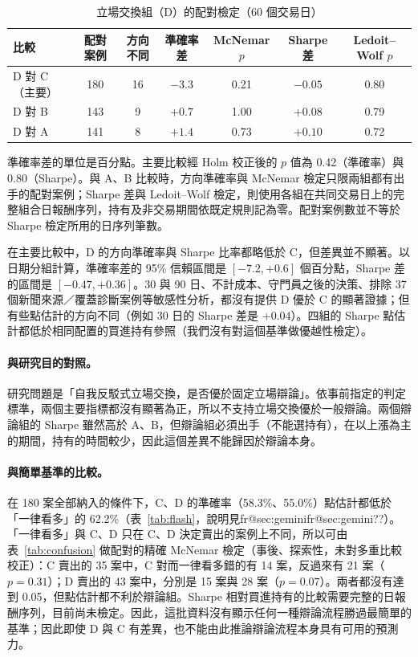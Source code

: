 \documentclass[12pt,a4paper]{article}
\makeatletter
\numberwithin{table}{section}
\numberwithin{figure}{section}
\newcommand{\frref}[1]{\ifcsname fr@#1\endcsname\csname fr@#1\endcsname\else ??\fi}
\newcommand{\grp}[1]{\textsf{#1}}
\makeatother
\begin{document}
\begin{table}[H]
\centering\small
\caption{立場交換組（\grp{D}）的配對檢定（60 個交易日）}
\label{tab:tests}
\setlength{\tabcolsep}{4pt}
\begin{tabular}{@{}lcccccc@{}}
\toprule
比較 & 配對案例 & 方向不同 & 準確率差 & McNemar $p$ & Sharpe 差 & Ledoit--Wolf $p$ \\
\midrule
\grp{D} 對 \grp{C}（主要） & 180 & 16 & $-3.3$ & 0.21 & $-0.05$ & 0.80 \\
\grp{D} 對 \grp{B} & 143 & 9 & $+0.7$ & 1.00 & $+0.08$ & 0.79 \\
\grp{D} 對 \grp{A} & 141 & 8 & $+1.4$ & 0.73 & $+0.10$ & 0.72 \\
\bottomrule
\end{tabular}
\par\smallskip
\raggedright\footnotesize 準確率差的單位是百分點。主要比較經 Holm 校正後的 $p$ 值為 0.42（準確率）與 0.80（Sharpe）。與 \grp{A}、\grp{B} 比較時，方向準確率與 McNemar 檢定只限兩組都有出手的配對案例；Sharpe 差與 Ledoit--Wolf 檢定，則使用各組在共同交易日上的完整組合日報酬序列，持有及非交易期間依既定規則記為零。配對案例數並不等於 Sharpe 檢定所用的日序列筆數。
\end{table}

在主要比較中，\grp{D} 的方向準確率與 Sharpe 比率都略低於 \grp{C}，但差異並不顯著。以日期分組計算，準確率差的 95\% 信賴區間是 $[-7.2, +0.6]$ 個百分點，Sharpe 差的區間是 $[-0.47,+0.36]$。30 與 90 日、不計成本、守門員之後的決策、排除 37 個新聞來源／覆蓋診斷案例等敏感性分析，都沒有提供 \grp{D} 優於 \grp{C} 的顯著證據；但有些點估計的方向不同（例如 30 日的 Sharpe 差是 $+0.04$）。四組的 Sharpe 點估計都低於相同配置的買進持有參照（我們沒有對這個基準做優越性檢定）。

\paragraph{與研究目的對照。} 研究問題是「自我反駁式立場交換，是否優於固定立場辯論」。依事前指定的判定標準，兩個主要指標都沒有顯著為正，所以不支持立場交換優於一般辯論。兩個辯論組的 Sharpe 雖然高於 \grp{A}、\grp{B}，但辯論組必須出手（不能選持有），在以上漲為主的期間，持有的時間較少，因此這個差異不能歸因於辯論本身。

\paragraph{與簡單基準的比較。} 在 180 案全部納入的條件下，\grp{C}、\grp{D} 的準確率（58.3\%、55.0\%）點估計都低於「一律看多」的 62.2\%（表~\ref{tab:flash}，說明見\frref{sec:gemini}）。「一律看多」與 C、D 只在 C、D 決定賣出的案例上不同，所以可由表~\ref{tab:confusion} 做配對的精確 McNemar 檢定（事後、探索性，未對多重比較校正）：C 賣出的 35 案中，C 對而一律看多錯的有 14 案，反過來有 21 案（$p=0.31$）；D 賣出的 43 案中，分別是 15 案與 28 案（$p=0.07$）。兩者都沒有達到 0.05，但點估計都不利於辯論組。Sharpe 相對買進持有的比較需要完整的日報酬序列，目前尚未檢定。因此，這批資料沒有顯示任何一種辯論流程勝過最簡單的基準；因此即使 \grp{D} 與 \grp{C} 有差異，也不能由此推論辯論流程本身具有可用的預測力。
\end{document}
